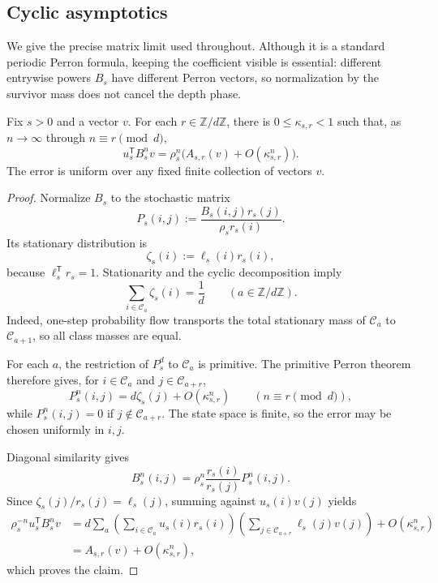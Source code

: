 \subsection{Cyclic asymptotics}

We give the precise matrix limit used throughout.  Although it is a
standard periodic Perron formula, keeping the coefficient visible is
essential: different entrywise powers \(B_s\) have different Perron
vectors, so normalization by the survivor mass does not cancel the
depth phase.

\begin{proposition}
\label{prop:cyclic-perron}
Fix \(s>0\) and a vector \(v\).  For each
\(r\in\mathbb Z/d\mathbb Z\), there is \(0\leq\kappa_{s,r}<1\) such
that, as \(n\to\infty\) through \(n\equiv r\pmod d\),
\begin{equation}
  u_s^{\mathsf T}B_s^n v
  =\rho_s^n\bigl(A_{s,r}(v)+O(\kappa_{s,r}^n)\bigr).
  \label{eq:cyclic-perron-asymptotic}
\end{equation}
The error is uniform over any fixed finite collection of vectors \(v\).
\end{proposition}

\begin{proof}
Normalize \(B_s\) to the stochastic matrix
\[
  P_s(i,j):=\frac{B_s(i,j)r_s(j)}{\rho_s r_s(i)}.
\]
Its stationary distribution is
\[
  \zeta_s(i):=\ell_s(i)r_s(i),
\]
because \(\ell_s^{\mathsf T}r_s=1\).  Stationarity and the cyclic
decomposition imply
\[
  \sum_{i\in\mathcal C_a}\zeta_s(i)=\frac1d
  \qquad(a\in\mathbb Z/d\mathbb Z).
\]
Indeed, one-step probability flow transports the total stationary mass of
\(\mathcal C_a\) to \(\mathcal C_{a+1}\), so all class masses are
equal.

For each \(a\), the restriction of \(P_s^d\) to
\(\mathcal C_a\) is primitive.  The primitive Perron theorem therefore
gives, for \(i\in\mathcal C_a\) and
\(j\in\mathcal C_{a+r}\),
\[
  P_s^n(i,j)
  =d\zeta_s(j)+O(\kappa_{s,r}^n)
  \qquad(n\equiv r\pmod d),
\]
while \(P_s^n(i,j)=0\) if \(j\notin\mathcal C_{a+r}\).  The state
space is finite, so the error may be chosen uniformly in \(i,j\).

Diagonal similarity gives
\[
  B_s^n(i,j)
  =\rho_s^n\frac{r_s(i)}{r_s(j)}P_s^n(i,j).
\]
Since \(\zeta_s(j)/r_s(j)=\ell_s(j)\), summing against
\(u_s(i)v(j)\) yields
\begin{align*}
  \rho_s^{-n}u_s^{\mathsf T}B_s^n v
  &=d\sum_a
      \left(\sum_{i\in\mathcal C_a}u_s(i)r_s(i)\right)
      \left(\sum_{j\in\mathcal C_{a+r}}\ell_s(j)v(j)\right)
      +O(\kappa_{s,r}^n)\\
  &=A_{s,r}(v)+O(\kappa_{s,r}^n),
\end{align*}
which proves the claim.
\end{proof}

